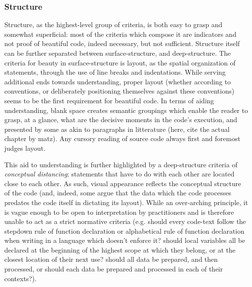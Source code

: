 \subsubsection{Structure}
\label{subsubsec:framework-structure}

Structure, as the highest-level group of criteria, is both easy to grasp and somewhat superficial: most of the criteria which compose it are indicators and not proof of beautiful code, indeed necessary,  but not sufficient. Structure itself can be further separated between surface-structure, and deep-structure. The criteria for beauty in surface-structure is layout, as the spatial organization of statements, through the use of line breaks and indentations. While serving additional ends towards understanding, proper layout (whether according to conventions, or deliberately positioning themselves against these conventions) seems to be the first requirement for beautiful code. In terms of aiding understanding, blank space creates semantic groupings which enable the reader to grasp, at a glance, what are the decisive moments \citep{sennett_craftsman_2009} in the code's execution, and presented by some as akin to paragraphs in litterature \citep{oram_beautiful_2007} (here, cite the actual chapter by matz). Any cursory reading of source code always first and foremost judges layout.

This aid to understanding is further highlighted by a deep-structure criteria of \emph{conceptual distancing}; statements that have to do with each other are located close to each other. As such, visual appearance reflects the conceptual structure of the code (and, indeed, some argue that the data which the code processes predates the code itself in dictating its layout). While an over-arching principle, it is vague enough to be open to interpretation by practitioners and is therefore unable to act as a strict normative criteria (e.g. should every code-text follow the stepdown rule of function declaration or alphabetical rule of function declaration when writing in a language which doesn't enforce it? should local variables all be declared at the beginning of the highest scope at which they belong, or at the closest location of their next use? should all data be prepared, and then processed, or should each data be prepared and processed in each of their contexts?).

